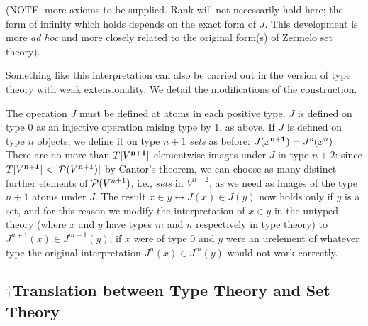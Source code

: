 \documentclass[12pt]{book}
\begin{document}
(NOTE: more axioms to be supplied.  Rank will not necessarily hold
here; the form of infinity which holds depends on the exact form of
$J$.  This development is more {\em ad hoc\/} and more closely related
to the original form(s) of Zermelo set theory).

Something like this interpretation can also be carried out in the
version of type theory with weak extensionality.  We detail the
modifications of the construction.

The operation $J$ must be defined at atoms in each positive type.  $J$
is defined on type 0 as an injective operation raising type by 1, as
above.  If $J$ is defined on type $n$ objects, we define it on type
$n+1$ {\em sets\/} as before: $J(x^{\bf n+1}) = J``(x^n)$.  There are
no more than $T|V^{\bf n+1}|$ elementwise images under $J$ in type
$n+2$: since $T|V^{\bf n+1}|<|{\cal P}(V^{\bf n+1})|$ by Cantor's
theorem, we can choose as many distinct further elements of ${\cal
P}(V^{n+1})$, i.e., {\em sets\/} in $V^{n+2}$, as we need as images of
the type $n+1$ atoms under $J$.  The result $x \in y \leftrightarrow J(x) \in
J(y)$ now holds only if $y$ is a set, and for this reason we modify
the interpretation of $x \in y$ in the untyped theory (where $x$ and
$y$ have types $m$ and $n$ respectively in type theory) to $J^{n+1}(x)
\in J^{m+1}(y)$; if $x$ were of type 0 and $y$ were an urelement of
whatever type the original interpretation $J^n(x) \in J^m(y)$ would
not work correctly. 

\newpage

\subsection{$\dagger$Translation between Type Theory and Set Theory}
\end{document}
